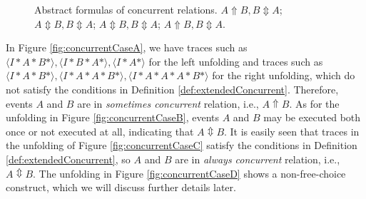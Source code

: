 \documentclass{llncs}
\begin{document}
\begin{figure}[htbp]
{\begin{minipage}[b]{0.3\textwidth}
	\end{minipage}
	\label{fig:concurrentCaseC}
}
\caption{Abstract formulas of concurrent relations.  $A\Uparrow B,B\Updownarrow A$;  $A\Updownarrow B,B\Updownarrow A$;  $A\Updownarrow B,B\Updownarrow A$;  $A\Uparrow B,B\Updownarrow A$.\label{fig:concurrentCases}}
\end{figure}

In Figure \ref{fig:concurrentCaseA}, we have traces such as $\langle I*A*B*\rangle ,\langle I*B*A*\rangle ,\langle I*A*\rangle $ for the left unfolding and traces such as $\langle I*A*B*\rangle ,\langle I*A*A*B*\rangle ,\langle I*A*A*A*B*\rangle$ for the right unfolding, which do not satisfy the conditions in Definition \ref{def:extendedConcurrent}. Therefore, events $A$ and $B$ are in \textit{sometimes concurrent} relation, i.e., $A\Uparrow B$. As for the unfolding in Figure \ref{fig:concurrentCaseB}, events $A$ and $B$ may be executed both once or not executed at all, indicating that $A\Updownarrow B$. It is easily seen that traces in the unfolding of Figure \ref{fig:concurrentCaseC} satisfy the conditions in Definition \ref{def:extendedConcurrent}, so $A$ and $B$ are in \textit{always concurrent} relation, i.e., $A\Updownarrow B$. The unfolding in Figure \ref{fig:concurrentCaseD} shows a non-free-choice construct, which we will discuss further details later.
\end{document}
